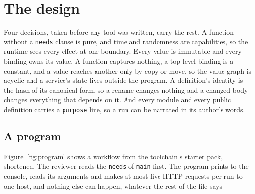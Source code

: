 \documentclass[11pt]{article}
\begin{document}
\section{The design}
\label{sec:design}

Four decisions, taken before any tool was written, carry the rest. A
function without a \texttt{needs} clause is pure, and time and
randomness are capabilities, so the runtime sees every effect at one
boundary. Every value is immutable and every binding owns its value. A
function captures nothing, a top-level binding is a constant, and a
value reaches another only by copy or move, so the value graph is
acyclic and a service's state lives outside the program. A definition's
identity is the hash of its canonical form, so a rename changes nothing
and a changed body changes everything that depends on it. And every
module and every public definition carries a \texttt{purpose} line, so
a run can be narrated in its author's words.

\subsection{A program}

Figure~\ref{fig:program} shows a workflow from the toolchain's starter
pack, shortened. The reviewer reads the \texttt{needs} of \texttt{main}
first. The program prints to the console, reads its arguments and makes
at most five HTTP requests per run to one host, and nothing else can
happen, whatever the rest of the file says.
\end{document}
